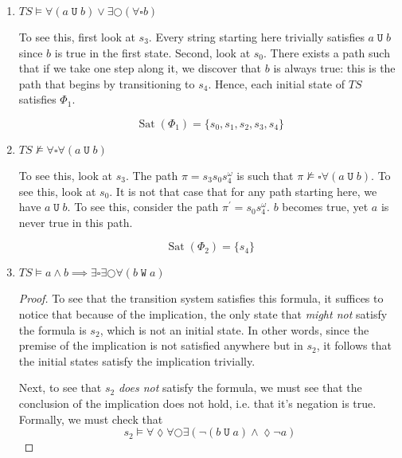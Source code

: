 \documentclass[letterpaper,11pt]{article}
\newcommand{\eventually}{\lozenge}
\newcommand{\always}{\square}
\newcommand{\nmodels}{\nvDash}
\newcommand{\step}{\bigcirc}
\DeclareMathOperator{\untilOp}{\mathtt{U}}
\newcommand{\until}{\untilOp{}}
\DeclareMathOperator{\wuntilOp}{\mathtt{W}}
\newcommand{\wuntil}{\wuntilOp{}}
\newcommand{\parens}[1]{\left(#1\right)}
\DeclareMathOperator{\Sat}{Sat}
\newcommand{\sat}[1]{\Sat{\parens{#1}}}
\begin{document}
\begin{enumerate}
    \item $TS \models \forall (a \until b) \lor \exists \step (\forall \always b)$

        To see this, first look at $s_3$. Every string starting here trivially
        satisfies $a \until b$ since $b$ is true in the first state.
        Second, look at $s_0$. There exists a path such that if we take one
        step along it, we discover that $b$ is always true: this is the path
        that begins by transitioning to $s_4$. Hence, each initial state of
        $TS$ satisfies $\Phi_1$.

        \begin{equation*}
            \sat{\Phi_1} = \{ s_0, s_1, s_2, s_3, s_4 \}
        \end{equation*}

    \item $TS \nmodels \forall \always \forall (a \until b)$

        To see this, look at $s_3$. The path $\pi = s_3 s_0 s_4^\omega$
        is such that $\pi \nmodels \always \forall (a \until b)$. To see this,
        look at $s_0$. It is not that case that for any path starting here, we
        have $a \until b$. To see this, consider the path
        $\pi^\prime = s_0 s_4^\omega$. $b$ becomes true, yet $a$ is never true
        in this path.

        \begin{equation*}
            \sat{\Phi_2} = \{ s_4 \}
        \end{equation*}

    \item $
        TS \models
        a \land b
        \implies
        \exists \always \exists \step \forall \parens{b \wuntil a}
        $

        \begin{proof}
            To see that the transition system satisfies this formula, it
            suffices to notice that because of the implication, the only state
            that \emph{might not} satisfy the formula is $s_2$, which is not an
            initial state. In other words, since the premise of the implication
            is not satisfied anywhere but in $s_2$, it follows that the initial
            states satisfy the implication trivially.

            Next, to see that $s_2$ \emph{does not} satisfy the formula, we
            must see that the conclusion of the implication does not hold, i.e.
            that it's negation is true. Formally, we must check that
            \begin{equation*}
                s_2 \models
                \forall \eventually \forall \step \exists \parens{
                    \neg\parens{b \until a}
                    \land
                    \eventually \neg a
                }
            \end{equation*}


\end{proof}
\end{enumerate}
\end{document}
